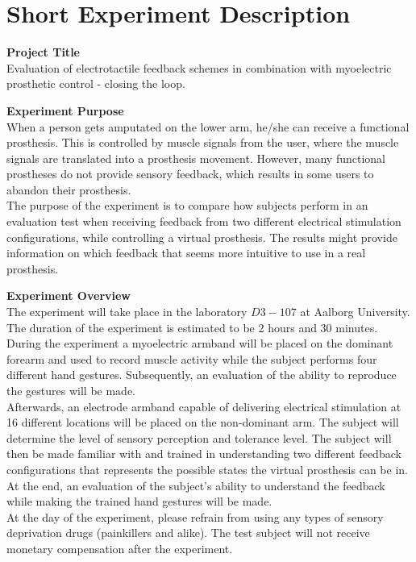 \section{Short Experiment Description}

\textbf{Project Title} \\
Evaluation of electrotactile feedback schemes in combination with myoelectric prosthetic control - closing the loop.

\textbf{Experiment Purpose} \\
When a person gets amputated on the lower arm, he/she can receive a functional prosthesis. This is controlled by muscle signals from the user, where the muscle signals are translated into a prosthesis movement. However, many functional prostheses do not provide sensory feedback, which results in some users to abandon their prosthesis.\\
The purpose of the experiment is to compare how subjects perform in an evaluation test when receiving feedback from two different electrical stimulation configurations, while controlling a virtual prosthesis. The results might provide information on which feedback that seems more intuitive to use in a real prosthesis.   

\textbf{Experiment Overview} \\
The experiment will take place in the laboratory $D3-107$ at Aalborg University. The duration of the experiment is estimated to be 2 hours and 30 minutes. \\
During the experiment a myoelectric armband will be placed on the dominant forearm and used to record muscle activity while the subject performs four different hand gestures. Subsequently, an evaluation of the ability to reproduce the gestures will be made. \\
Afterwards, an electrode armband capable of delivering electrical stimulation at 16 different locations will be placed on the non-dominant arm. The subject will determine the level of sensory perception and tolerance level. The subject will then be made familiar with and trained in understanding two different feedback configurations that represents the possible states the virtual prosthesis can be in. At the end, an evaluation of the subject’s ability to understand the feedback while making the trained hand gestures will be made. \\
At the day of the experiment, please refrain from using any types of sensory deprivation drugs (painkillers and alike). The test subject will not receive monetary compensation after the experiment. 
